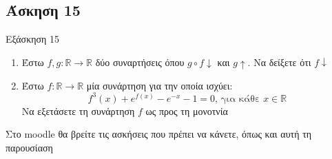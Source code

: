 \documentclass[greek]{beamer}
\begin{document}
\subsection{Άσκηση 15}
\begin{frame}[label=Άσκηση15]{Εξάσκηση 15}

      \begin{enumerate}
            \item Έστω $f,g:\mathbb{R}\to\mathbb{R}$ δύο συναρτήσεις όπου $g\circ f \downarrow$ και $g\uparrow$. Να δείξετε ότι $f\downarrow$ \pause
            \item Έστω $f:\mathbb{R}\to\mathbb{R}$ μία συνάρτηση για την οποία ισχύει:
                  $$f^3(x)+e^{f(x)}-e^{-x}-1=0\text{, για κάθε } x\in\mathbb{R}$$
                  Να εξετάσετε τη συνάρτηση $f$ ως προς τη μονοτνία
      \end{enumerate}
\end{frame}

\begin{frame}
      Στο moodle θα βρείτε τις ασκήσεις που πρέπει να κάνετε, όπως και αυτή τη παρουσίαση
\end{frame}
\end{document}
